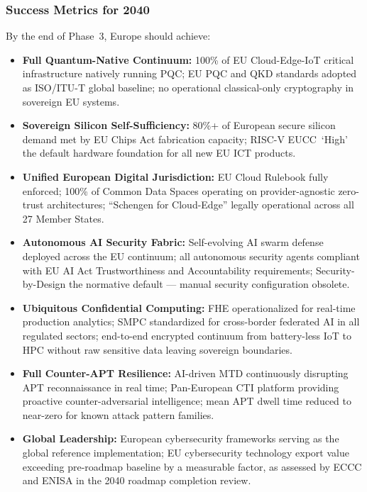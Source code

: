 \subsubsection*{Success Metrics for 2040}
By the end of Phase~3, Europe should achieve:
\begin{itemize}
    \item \textbf{Full Quantum-Native Continuum:}
    100\% of EU Cloud-Edge-IoT critical infrastructure natively running
    PQC; EU PQC and QKD standards adopted as ISO/ITU-T global baseline;
    no operational classical-only cryptography in sovereign EU systems.

    \item \textbf{Sovereign Silicon Self-Sufficiency:}
    80\%+ of European secure silicon demand met by EU Chips Act
    fabrication capacity; RISC-V EUCC~`High' the default hardware
    foundation for all new EU ICT products.

    \item \textbf{Unified European Digital Jurisdiction:}
    EU Cloud Rulebook fully enforced; 100\% of Common Data Spaces
    operating on provider-agnostic zero-trust architectures;
    ``Schengen for Cloud-Edge'' legally operational across all 27
    Member States.

    \item \textbf{Autonomous AI Security Fabric:}
    Self-evolving AI swarm defense deployed across the EU continuum;
    all autonomous security agents compliant with EU AI Act
    Trustworthiness and Accountability requirements; Security-by-Design
    the normative default --- manual security configuration obsolete.

    \item \textbf{Ubiquitous Confidential Computing:}
    FHE operationalized for real-time production analytics; SMPC
    standardized for cross-border federated AI in all regulated
    sectors; end-to-end encrypted continuum from battery-less IoT to
    HPC without raw sensitive data leaving sovereign boundaries.

    \item \textbf{Full Counter-APT Resilience:}
    AI-driven MTD continuously disrupting APT reconnaissance in real
    time; Pan-European CTI platform providing proactive
    counter-adversarial intelligence; mean APT dwell time reduced to
    near-zero for known attack pattern families.

    \item \textbf{Global Leadership:}
    European cybersecurity frameworks serving as the global reference
    implementation; EU cybersecurity technology export value exceeding
    pre-roadmap baseline by a measurable factor, as assessed by ECCC
    and ENISA in the 2040 roadmap completion review.
\end{itemize}
